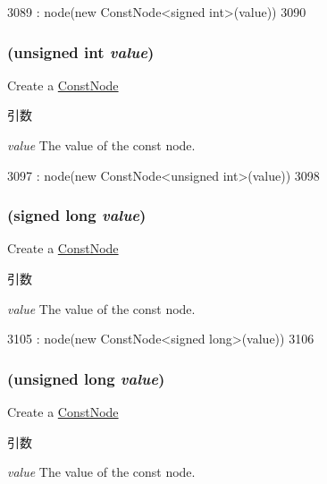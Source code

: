 \begin{DoxyCode}
3089         : node(new ConstNode<signed int>(value))
3090     { }
\end{DoxyCode}
\hypertarget{classStats_1_1Temp_a3f96b380a4b54f2a5419b26b731d4ab3}{
\subsubsection[{Temp}]{ (unsigned int {\em value})}}
\label{classStats_1_1Temp_a3f96b380a4b54f2a5419b26b731d4ab3}
Create a \hyperlink{classStats_1_1ConstNode}{ConstNode} 
\begin{DoxyParams}{引数}
\item[{\em value}]The value of the const node. \end{DoxyParams}



\begin{DoxyCode}
3097         : node(new ConstNode<unsigned int>(value))
3098     { }
\end{DoxyCode}
\hypertarget{classStats_1_1Temp_af5aa35210a4bb8a13b757ed7457fa332}{
\subsubsection[{Temp}]{ (signed long {\em value})}}
\label{classStats_1_1Temp_af5aa35210a4bb8a13b757ed7457fa332}
Create a \hyperlink{classStats_1_1ConstNode}{ConstNode} 
\begin{DoxyParams}{引数}
\item[{\em value}]The value of the const node. \end{DoxyParams}



\begin{DoxyCode}
3105         : node(new ConstNode<signed long>(value))
3106     { }
\end{DoxyCode}
\hypertarget{classStats_1_1Temp_a47e3f83051230ab10dc3a88c9bf47650}{
\subsubsection[{Temp}]{ (unsigned long {\em value})}}
\label{classStats_1_1Temp_a47e3f83051230ab10dc3a88c9bf47650}
Create a \hyperlink{classStats_1_1ConstNode}{ConstNode} 
\begin{DoxyParams}{引数}
\item[{\em value}]The value of the const node. \end{DoxyParams}



